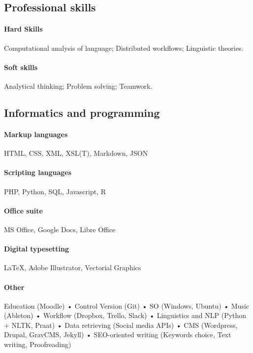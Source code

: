 \documentclass[10pt, a4paper]{article}
\begin{document}
\subsection{Professional skills}
\paragraph{Hard Skills}
Computational analysis of language; Distributed workflows; Linguistic theories.
\paragraph{Soft skills}  
Analytical thinking; Problem solving; Teamwork. 






\subsection{Informatics and programming}
\paragraph{Markup languages} HTML, CSS, XML, XSL(T), Markdown, JSON
\paragraph{Scripting languages}  PHP, Python, SQL, Javascript, R
\paragraph{Office suite}  MS Office, Google Docs, Libre Office
\paragraph{Digital typesetting} \LaTeX, Adobe Illustrator, Vectorial Graphics
\paragraph{Other} Education (Moodle) • Control Version (Git) • SO (Windows, Ubuntu) • Music (Ableton) • Workflow (Dropbox, Trello, Slack) • Linguistics and NLP (Python + NLTK, Praat) • Data retrieving (Social media APIs) • CMS (Wordpress, Drupal, GravCMS, Jekyll) • SEO-oriented writing (Keywords choice, Text writing, Proofreading) \\


\end{document}
